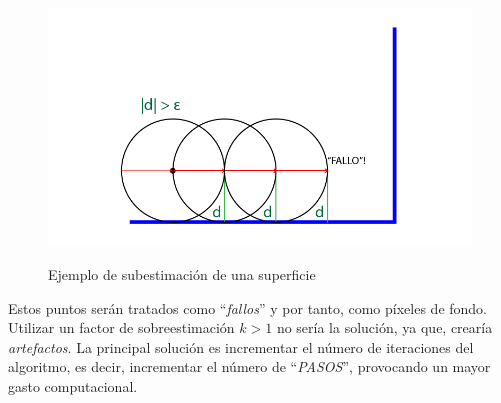 \begin{figure}[H]
  \centering
  \captionsetup{justification=centering}%
  \includegraphics[width=1.0\textwidth]{secciones/imagenes/estimation/subestimacion.png}\label{fig:subestimacion}
  \caption{Ejemplo de subestimación de una superficie}
\end{figure}

Estos puntos serán tratados como \enquote{\textit{fallos}} y por tanto, como píxeles de fondo. Utilizar un factor de sobreestimación \(k > 1\) no sería la solución, ya que, crearía \textit{artefactos}. La principal solución es incrementar el número de iteraciones del algoritmo, es decir, incrementar el número de \enquote{\textit{PASOS}}, provocando un mayor gasto computacional.